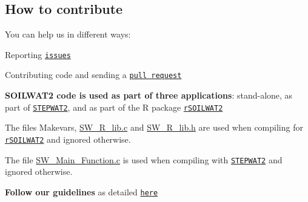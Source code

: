 \subsection*{How to contribute}

You can help us in different ways\+:


\begin{DoxyEnumerate}
\item Reporting \href{https://github.com/Burke-Lauenroth-Lab/SOILWAT2/issues}{\tt issues}
\item Contributing code and sending a \href{https://github.com/Burke-Lauenroth-Lab/SOILWAT2/pulls}{\tt pull request}
\end{DoxyEnumerate}

{\bfseries S\+O\+I\+L\+W\+A\+T2 code is used as part of three applications}\+: stand-\/alone, as part of \href{https://github.com/Burke-Lauenroth-Lab/STEPWAT2}{\tt S\+T\+E\+P\+W\+A\+T2}, and as part of the R package \href{https://github.com/Burke-Lauenroth-Lab/rSOILWAT2}{\tt r\+S\+O\+I\+L\+W\+A\+T2}
\begin{DoxyItemize}
\item The files \textquotesingle{}Makevars\textquotesingle{}, \textquotesingle{}\hyperlink{_s_w___r__lib_8c}{S\+W\+\_\+\+R\+\_\+lib.\+c}\textquotesingle{} and \textquotesingle{}\hyperlink{_s_w___r__lib_8h}{S\+W\+\_\+\+R\+\_\+lib.\+h}\textquotesingle{} are used when compiling for \href{https://github.com/Burke-Lauenroth-Lab/rSOILWAT2}{\tt r\+S\+O\+I\+L\+W\+A\+T2} and ignored otherwise.
\item The file \textquotesingle{}\hyperlink{_s_w___main___function_8c}{S\+W\+\_\+\+Main\+\_\+\+Function.\+c}\textquotesingle{} is used when compiling with \href{https://github.com/Burke-Lauenroth-Lab/STEPWAT2}{\tt S\+T\+E\+P\+W\+A\+T2} and ignored otherwise.
\end{DoxyItemize}

{\bfseries Follow our guidelines} as detailed \href{https://github.com/Burke-Lauenroth-Lab/workflow_guidelines}{\tt here}

